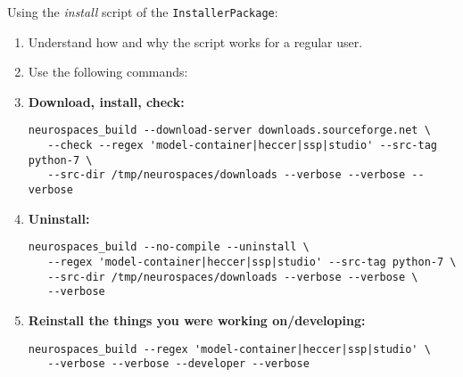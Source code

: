 \documentclass[12pt]{article}
\begin{document}
Using the {\it install} script of the {\tt InstallerPackage}:
\begin{enumerate}
\item Understand how and why the script works for a regular user.
\item Use the following commands:

\item[] {\bf Download, install, check:}
\begin{verbatim}
neurospaces_build --download-server downloads.sourceforge.net \
   --check --regex 'model-container|heccer|ssp|studio' --src-tag python-7 \
   --src-dir /tmp/neurospaces/downloads --verbose --verbose --verbose
\end{verbatim}

\item[]{\bf Uninstall:}
\begin{verbatim}
neurospaces_build --no-compile --uninstall \
   --regex 'model-container|heccer|ssp|studio' --src-tag python-7 \
   --src-dir /tmp/neurospaces/downloads --verbose --verbose \
   --verbose
\end{verbatim}

\item[]{\bf Reinstall the things you were working on/developing:}
\begin{verbatim}
neurospaces_build --regex 'model-container|heccer|ssp|studio' \
   --verbose --verbose --developer --verbose
\end{verbatim}

\end{enumerate}
\end{document}
